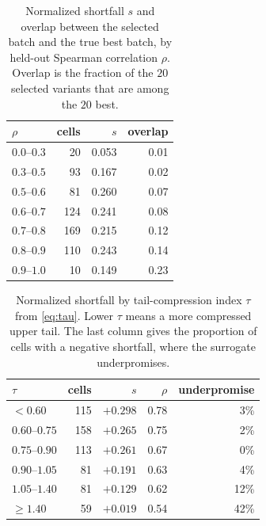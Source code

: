 \documentclass{article}
\theoremstyle{plain}
\theoremstyle{definition}
\begin{document}
\begin{table}[ht]
\caption{Normalized shortfall $s$ and overlap between the selected batch and the true
best batch, by held-out Spearman correlation $\rho$. Overlap is the fraction of the
$20$ selected variants that are among the $20$ best.}
\label{tab:byrho}
\vskip 0.1in
\begin{center}
\begin{small}
\begin{tabular}{lrrr}
\toprule
$\rho$ & cells & $s$ & overlap \\
\midrule
$0.0$--$0.3$ & 20  & 0.053 & 0.01 \\
$0.3$--$0.5$ & 93  & 0.167 & 0.02 \\
$0.5$--$0.6$ & 81  & 0.260 & 0.07 \\
$0.6$--$0.7$ & 124 & 0.241 & 0.08 \\
$0.7$--$0.8$ & 169 & 0.215 & 0.12 \\
$0.8$--$0.9$ & 110 & 0.243 & 0.14 \\
$0.9$--$1.0$ & 10  & 0.149 & 0.23 \\
\bottomrule
\end{tabular}
\end{small}
\end{center}
\vskip -0.1in
\end{table}

\begin{table}[ht]
\caption{Normalized shortfall by tail-compression index $\tau$ from \cref{eq:tau}.
Lower $\tau$ means a more compressed upper tail. The last column gives the proportion
of cells with a negative shortfall, where the surrogate underpromises.}
\label{tab:tau}
\vskip 0.1in
\begin{center}
\begin{small}
\begin{tabular}{lrrrr}
\toprule
$\tau$ & cells & $s$ & $\rho$ & underpromise \\
\midrule
$<0.60$        & 115 & $+0.298$ & 0.78 & \phantom{0}3\% \\
$0.60$--$0.75$ & 158 & $+0.265$ & 0.75 & \phantom{0}2\% \\
$0.75$--$0.90$ & 113 & $+0.261$ & 0.67 & \phantom{0}0\% \\
$0.90$--$1.05$ & 81  & $+0.191$ & 0.63 & \phantom{0}4\% \\
$1.05$--$1.40$ & 81  & $+0.129$ & 0.62 & 12\% \\
$\ge 1.40$     & 59  & $+0.019$ & 0.54 & 42\% \\
\bottomrule
\end{tabular}
\end{small}
\end{center}
\vskip -0.1in
\end{table}
\end{document}
